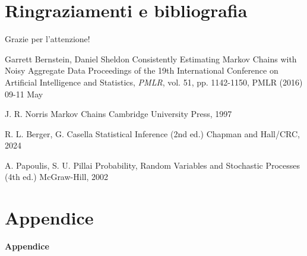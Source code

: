 \documentclass[10pt,xcolor={table,dvipsnames}]{beamer} 		%
\theoremstyle{plain}					%
\theoremstyle{definition}
\theoremstyle{remark}
\begin{document}
	

    
\section{Ringraziamenti e bibliografia}
    \begin{frame}
        \begin{center}
            \Huge{Grazie per l'attenzione!}
        \end{center}
    \end{frame}

	\begin{frame}{\refname}
		\begin{thebibliography}{9}
			 Garrett Bernstein, Daniel Sheldon
			\newblock Consistently Estimating Markov Chains with Noisy Aggregate Data
			\newblock Proceedings of the 19th International Conference on Artificial Intelligence and Statistics, \emph{PMLR}, vol. 51, pp. 1142-1150, PMLR (2016) 09-11 May

			 J. R. Norris
			\newblock Markov Chains
			\newblock Cambridge University Press, 1997

			 R. L. Berger, G. Casella
			\newblock Statistical Inference (2nd ed.)
			\newblock Chapman and Hall/CRC, 2024

			 A. Papoulis, S. U. Pillai
			\newblock Probability, Random Variables and Stochastic Processes (4th ed.)
			\newblock McGraw-Hill, 2002
		\end{thebibliography}
	\end{frame}

\appendix

\section*{Appendice}
	\begin{frame}
		\begin{center}
			\Huge{\textbf{Appendice}}
		\end{center}
	\end{frame}
\end{document}
